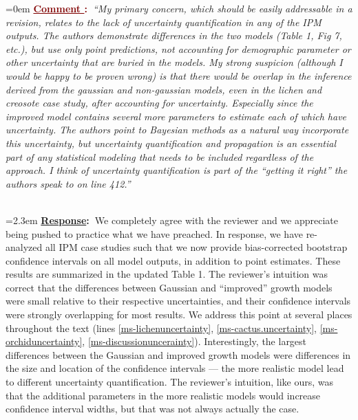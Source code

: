 \documentclass[12pt]{article}
\newcounter{cN}
\newcommand{\comment}[1]{
	\vspace{2em}
	\refstepcounter{cN} %
	\noindent \hangindent=0em \textbf{\textcolor{Maroon}{\uline{Comment \thecN}:~}}\emph{``#1''}
	}
\newcommand{\response}[1]{
	\\[0.25em]
	\hangindent=2.3em \textbf{\textcolor{NavyBlue}{\uline{Response}:~}}#1
	}
\newcommand{\spe}[1]{{\color{red}{#1}}}
\begin{document}
\comment{My primary concern, which should be easily addressable in a revision, relates to the lack of uncertainty quantification in any of the IPM outputs. The authors demonstrate differences in the two models (Table 1, Fig 7, etc.), but use only point predictions, not accounting for demographic parameter or other uncertainty that are buried in the models. My strong suspicion (although I would be happy to be proven wrong) is that there would be overlap in the inference derived from the gaussian and non-gaussian models, even in the lichen and creosote case study, after accounting for uncertainty. Especially since the improved model contains several more parameters to estimate each of which have uncertainty. The authors point to Bayesian methods as a natural way incorporate this uncertainty, but uncertainty quantification and propagation is an essential part of any statistical modeling that needs to be included regardless of the approach. I think of uncertainty quantification is part of the “getting it right” the authors speak to on line 412.}
\response{We completely agree with the reviewer and we appreciate being pushed to practice what we have preached. In response, we have re-analyzed all IPM case studies such that we now provide bias-corrected bootstrap confidence intervals on all model outputs, in addition to point estimates. These results are summarized in the updated Table 1. The reviewer's intuition was correct that the differences between Gaussian and ``improved'' growth models were small relative to their respective uncertainties, and their confidence intervals were strongly overlapping for most results. We address this point at several places throughout the text (lines \ref{ms-lichenuncertainty}, \ref{ms-cactus.uncertainty}, \ref{ms-orchiduncertainty}, \ref{ms-discussionuncerainty}). 
Interestingly, the largest differences between the Gaussian and improved growth models were differences in the
size and location of the confidence intervals --- the more realistic model lead to different uncertainty quantification. 
The reviewer's intuition, like ours, was that the additional parameters in the more realistic models would increase confidence interval widths, but that was not always actually the case. }
\end{document}

